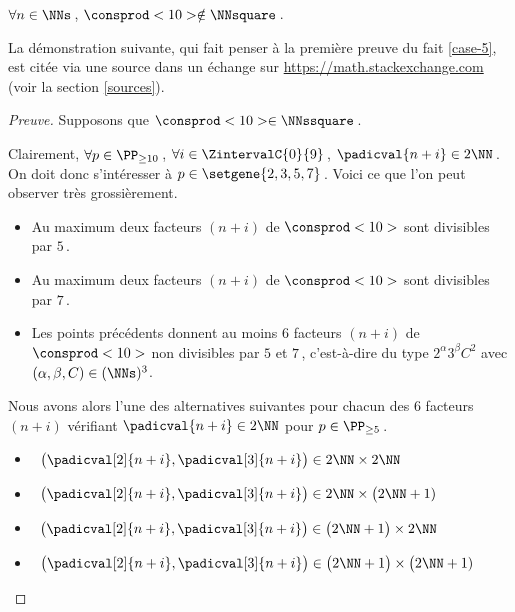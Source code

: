\begin{fact} \label{case-10}
	 $\forall n \in \NNs$\,, $\consprod<10> \notin \NNsquare$\,.
\end{fact}




La démonstration suivante, qui fait penser à la première preuve du fait \ref{case-5}, est citée via une source dans un échange sur \url{https://math.stackexchange.com} (voir la section \ref{sources}).


\begin{proof}[Preuve]%
    Supposons que $\consprod<10> \in \NNssquare$\,.
    
    \smallskip
    
    Clairement, 
    $\forall p \in \PP_{\geq 10}$\,, 
    $\forall i \in \ZintervalC{0}{9}$\,, 
    $\padicval{n + i} \in 2 \NN$\,.
    On doit donc s'intéresser à $p \in \setgene{2, 3, 5, 7}$\,. Voici ce que l'on peut observer très grossièrement.
    \begin{itemize}
		\item Au maximum deux facteurs $(n + i)$ de $\consprod<10>$ sont divisibles par $5$\,.

		\item Au maximum deux facteurs $(n + i)$ de $\consprod<10>$ sont divisibles par $7$\,.

		\item Les points précédents donnent au moins $6$ facteurs $(n + i)$ de $\consprod<10>$ non divisibles par $5$ et $7$\,, c'est-à-dire du type $2^\alpha 3^\beta C^2$ avec $(\alpha, \beta, C) \in ( \NNs )^3$.
    \end{itemize}
    
    Nous avons alors l'une des alternatives suivantes pour chacun des $6$ facteurs $(n+i)$ vérifiant $\padicval{n + i} \in 2 \NN$ pour $p \in \PP_{\geq 5}$\,.
    \begin{itemize}
    	\smallskip
		\item {}\,
		$\big( \padicval[2]{n + i} , \padicval[3]{n + i} \big) \in 2 \NN \times 2 \NN$

    	\smallskip
		\item {}\,
		$\big( \padicval[2]{n + i} , \padicval[3]{n + i} \big) \in 2 \NN \times \big( 2 \NN + 1)$

    	\smallskip
		\item {}\,
		$\big( \padicval[2]{n + i} , \padicval[3]{n + i} \big) \in \big( 2 \NN + 1 \big) \times 2 \NN$

    	\smallskip
		\item {}\,
		$\big( \padicval[2]{n + i} , \padicval[3]{n + i} \big) \in \big( 2 \NN + 1 \big) \times \big( 2 \NN + 1)$
    \end{itemize}
    

\end{proof}
